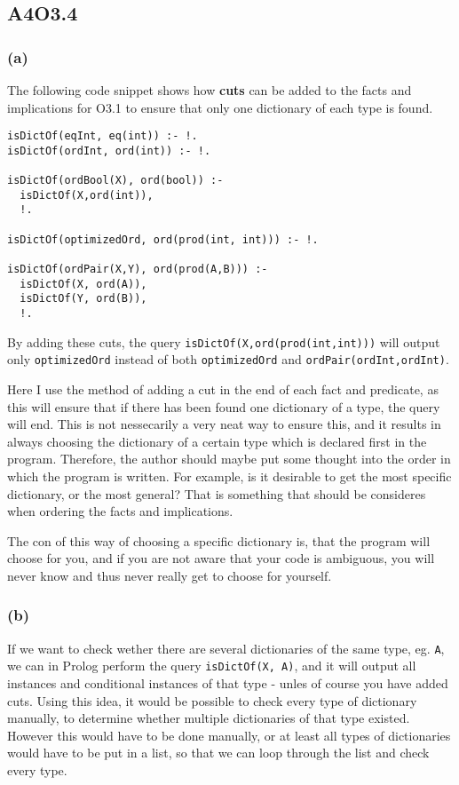 \subsection*{A4O3.4}

\subsubsection*{\textbf{(a)}}
The following code snippet shows how \textbf{cuts} can be added to the facts and implications for O3.1 to ensure that only one dictionary of each type is found.

\begin{verbatim}
isDictOf(eqInt, eq(int)) :- !.
isDictOf(ordInt, ord(int)) :- !.

isDictOf(ordBool(X), ord(bool)) :-
  isDictOf(X,ord(int)),
  !.

isDictOf(optimizedOrd, ord(prod(int, int))) :- !.

isDictOf(ordPair(X,Y), ord(prod(A,B))) :-
  isDictOf(X, ord(A)),
  isDictOf(Y, ord(B)),
  !.
\end{verbatim}

By adding these cuts, the query \texttt{isDictOf(X,ord(prod(int,int)))} will output only \texttt{optimizedOrd} instead of both \texttt{optimizedOrd} and \texttt{ordPair(ordInt,ordInt)}.

Here I use the method of adding a cut in the end of each fact and predicate, as this will ensure that if there has been found one dictionary of a type, the query will end. This is not nessecarily a very neat way to ensure this, and it results in always choosing the dictionary of a certain type which is declared first in the program. Therefore, the author should maybe put some thought into the order in which the program is written. For example, is it desirable to get the most specific dictionary, or the most general? That is something that should be consideres when ordering the facts and implications.

The con of this way of choosing a specific dictionary is, that the program will choose for you, and if you are not aware that your code is ambiguous, you will never know and thus never really get to choose for yourself.


\subsubsection*{\textbf{(b)}}
If we want to check wether there are several dictionaries of the same type, eg. \texttt{A}, we can in Prolog perform the query \texttt{isDictOf(X, A)}, and it will output all instances and conditional instances of that type - unles of course you have added cuts. Using this idea, it would be possible to check every type of dictionary manually, to determine whether multiple dictionaries of that type existed. However this would have to be done manually, or at least all types of dictionaries would have to be put in a list, so that we can loop through the list and check every type.
